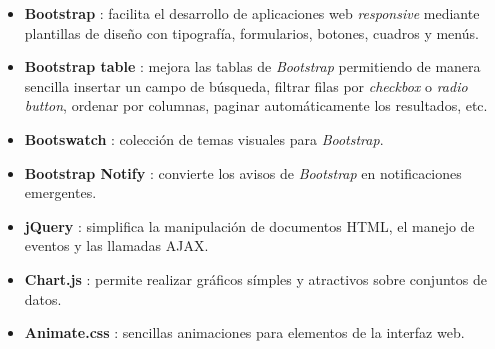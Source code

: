 \begin{itemize}
  \item \textbf{Bootstrap} \cite{bootstrap}: facilita el desarrollo de aplicaciones web \textit{responsive} \cite{responsive} mediante plantillas de diseño con tipografía, formularios, botones, cuadros y menús.

  \item \textbf{Bootstrap table} \cite{bootstraptable}: mejora las tablas de \textit{Bootstrap} permitiendo de manera sencilla insertar un campo de búsqueda, filtrar filas por \textit{checkbox} o \textit{radio button}, ordenar por columnas, paginar automáticamente los resultados, etc.

  \item \textbf{Bootswatch} \cite{bootswatch}: colección de temas visuales para \textit{Bootstrap}.

  \item \textbf{Bootstrap Notify} \cite{bootstrapnotify}: convierte los avisos de \textit{Bootstrap} en notificaciones emergentes.

  \item \textbf{jQuery} \cite{jquery}: simplifica la manipulación de documentos \gls{HTML}, el manejo de eventos y las llamadas \gls{AJAX}.

  \item \textbf{Chart.js} \cite{chartjs}: permite realizar gráficos símples y atractivos sobre conjuntos de datos.

  \item \textbf{Animate.css} \cite{animatecss}: sencillas animaciones para elementos de la interfaz web.

\end{itemize}